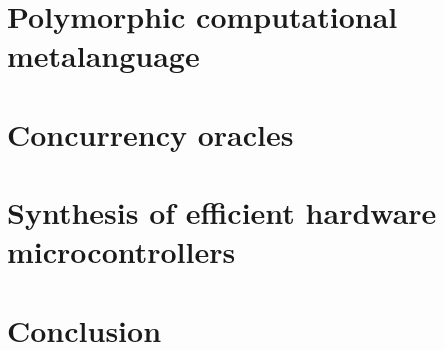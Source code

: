 \documentclass{llncs}
\begin{document}
\section{Polymorphic computational metalanguage\label{sec:metalanguage}}


\section{Concurrency oracles\label{sec:oracles}}


\section{Synthesis of efficient hardware microcontrollers\label{sec:scenarios}}


\section{Conclusion}

%
%
%

\end{document}
